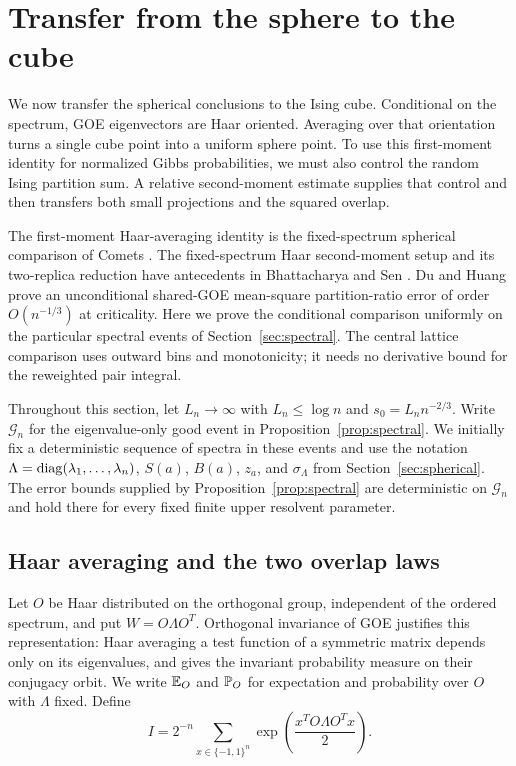 \section{Transfer from the sphere to the cube}
\label{sec:orientation}

We now transfer the spherical conclusions to the Ising cube.
Conditional on the spectrum, GOE eigenvectors are Haar oriented.
Averaging over that orientation turns a single cube point into a
uniform sphere point. To use this first-moment identity for normalized
Gibbs probabilities, we must also control the random Ising partition
sum. A relative second-moment estimate supplies that control and then
transfers both small projections and the squared overlap.

The first-moment Haar-averaging identity is the fixed-spectrum spherical
comparison of Comets \cite[Equations~(2.1)--(2.2)]{comets1996}.
The fixed-spectrum Haar second-moment setup and its two-replica
reduction have antecedents in Bhattacharya and Sen
\cite[Section~3.2.1]{bhattacharyaSen2016}. Du and Huang
\cite[Theorem~1.6]{duHuang2026FreeEnergy} prove an unconditional shared-GOE
mean-square partition-ratio error of order $O(n^{-1/3})$ at criticality.
Here we prove the
conditional comparison uniformly on the particular spectral events of
Section~\ref{sec:spectral}. The central lattice comparison uses outward
bins and monotonicity; it needs no derivative bound for the reweighted
pair integral.

Throughout this section, let $L_n\to\infty$ with $L_n\le\log n$ and
$s_0=L_n n^{-2/3}$.  Write $\mathcal G_n$ for the eigenvalue-only good event in
Proposition~\ref{prop:spectral}.  We initially fix a deterministic sequence of
spectra in these events and use the notation
$\Lambda=\operatorname{diag}(\lambda_1,\ldots,\lambda_n)$, $S(a)$, $B(a)$, $z_a$, and
$\sigma_\Lambda$ from Section~\ref{sec:spherical}.  The error bounds supplied by
Proposition~\ref{prop:spectral} are deterministic on $\mathcal G_n$ and hold there
for every fixed finite upper resolvent parameter.

\subsection{Haar averaging and the two overlap laws}

Let $O$ be Haar distributed on the orthogonal group, independent of the
ordered spectrum, and put $W=O\Lambda O^T$.  Orthogonal invariance of GOE
justifies this representation: Haar averaging a test function of a symmetric
matrix depends only on its eigenvalues, and gives the invariant probability
measure on their conjugacy orbit.  We write $\mathbb E_O$ and $\mathbb P_O$ for
expectation and probability over $O$ with $\Lambda$ fixed.  Define
\begin{equation}
 I=2^{-n}\sum_{x\in\{-1,1\}^n}
       \exp\!\left(\frac{x^T O\Lambda O^T x}{2}\right).
 \label{eq:orientation-ising-partition}
\end{equation}

